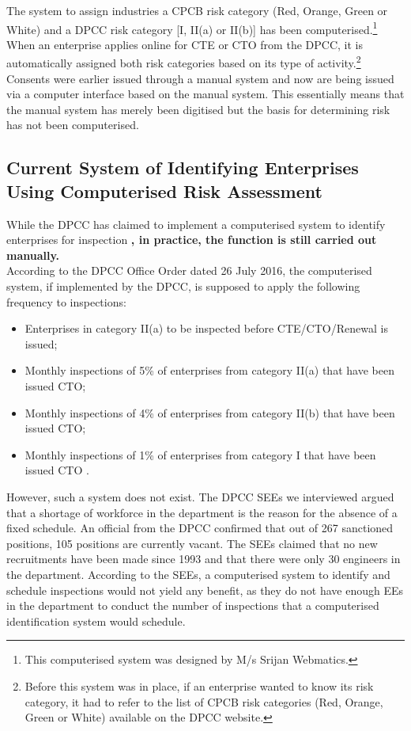 \documentclass[a4paper, 12pt]{article}
\begin{document}
                 
                 The system to assign industries a CPCB risk category (Red, Orange, Green or White) and a DPCC risk category [I, II(a) or II(b)] has been computerised.\footnote{This computerised system was designed by M/s Srijan Webmatics.} When an enterprise applies online for CTE or CTO from the DPCC, it is automatically assigned both risk categories based on its type of activity.\footnote{Before this system was in place, if an enterprise wanted to know its risk category, it had to refer to the list of CPCB risk categories (Red, Orange, Green or White) available on the DPCC website.} Consents were earlier issued through a manual system and now are being issued via a computer interface based on the manual system. This essentially means that the manual system has merely been digitised but the basis for determining risk has not been computerised. 
	\subsection{Current System of Identifying Enterprises Using Computerised Risk Assessment}
	
	{While the DPCC has claimed to implement a computerised system to identify enterprises for inspection} \parencite{DIPPb}\textbf{, in practice, the function is still carried out manually.} \\
	
	According to the DPCC Office Order dated 26 July 2016, the computerised system, if implemented by the DPCC, is supposed to apply the following frequency to inspections: 
	
	\begin{itemize}
	\item{Enterprises in category II(a) to be inspected before CTE/CTO/Renewal is issued;}
	\item{Monthly inspections of 5\% of enterprises from category II(a) that have been issued CTO;}
	\item{Monthly inspections of 4\% of enterprises from category II(b) that have been issued CTO;}
	\item{Monthly inspections of 1\% of enterprises from category I that have been issued CTO \parencite{DPCCb}.}
	\end{itemize} 
	
	However, such a system does not exist. The DPCC SEEs we interviewed argued that a shortage of workforce in the department is the reason for the absence of a fixed schedule. An official from the DPCC confirmed that out of 267 sanctioned positions, 105 positions are currently vacant. The SEEs claimed that no new recruitments have been made since 1993 and that there were only 30 engineers in the department. According to the SEEs, a computerised system to identify and schedule inspections would not yield any benefit, as they do not have enough EEs in the department to conduct the number of inspections that a computerised identification system would schedule. \\
	
\end{document}
